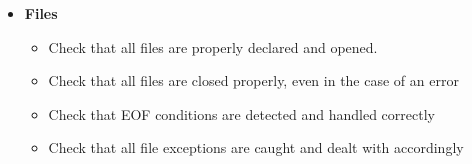 \documentclass[\mainpath/main]{subfiles}
\begin{document}
\begin{itemize}
		\item \textbf{Files}
		\begin{itemize}
			\item Check that all files are properly declared and opened.
			\item Check that all files are closed properly, even in the case of an error
			\item Check that EOF conditions are detected and handled correctly
			\item Check that all file exceptions are caught and dealt with accordingly
		\end{itemize}
		
	\end{itemize}
	
	
\end{document}
